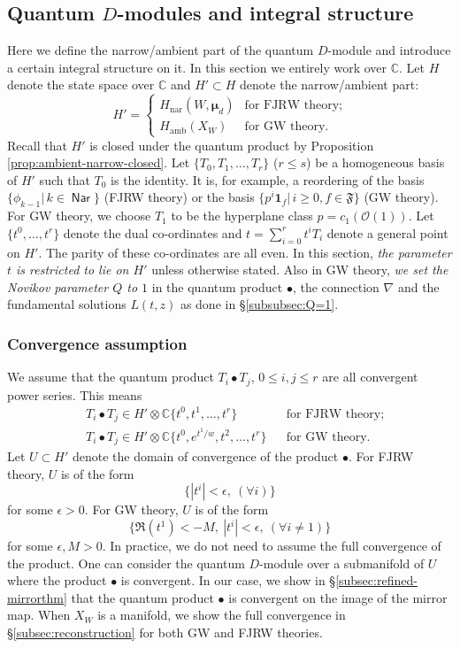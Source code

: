 \documentclass[11pt]{amsart}
\theoremstyle{definition} %
\theoremstyle{remark} %
\newcommand{\CC}{\mathbb C}
\newcommand{\nar}{\operatorname{nar}}
\newcommand{\bmu}{\boldsymbol{\mu}}
\newcommand{\cO}{\mathcal{O}}
\newcommand{\frF}{\mathfrak{F}}
\newcommand{\unit}{\boldsymbol{1}}
\newcommand{\Nar}{\operatorname{\mathsf{Nar}}}
\newcommand{\amb}{\operatorname{amb}}
\begin{document}
\subsection{Quantum $D$-modules and integral structure} 
\label{subsec:qdm_int} 
Here we define the narrow/ambient part of the 
quantum $D$-module and introduce a certain 
integral structure on it. 
In this section we entirely work over $\CC$. 
Let $H$ denote the state space over $\CC$ 
and $H'\subset H$ denote the narrow/ambient part: 
\begin{equation} 
\label{eq:narrow-ambient-part} 
H'= \begin{cases} 
H_{\nar}(W,\bmu_d) & \text{for FJRW theory;} \\
H_{\amb}(X_W) & \text{for GW theory.} 
\end{cases}  
\end{equation} 
Recall that $H'$ is closed under the quantum product 
by Proposition \ref{prop:ambient-narrow-closed}. 
Let $\{T_0,T_1,\dots,T_r\}$ ($r\le s$) be a homogeneous basis of 
$H'$ such that $T_0$ is the identity. 
It is, for example, a reordering of 
the basis $\{\phi_{k-1}|\, k\in \Nar\}$ (FJRW theory) 
or the basis $\{p^i \unit_f |\, i\ge 0, f\in \frF\}$ 
(GW theory). 
For GW theory, we choose $T_1$ 
to be the hyperplane class $p=c_1(\cO(1))$. 
Let $\{t^0,\dots,t^r\}$ denote the dual co-ordinates 
and $t = \sum_{i=0}^r t^i T_i$ denote a general point 
on $H'$.  
The parity of these co-ordinates are all even. 
In this section, \emph{the parameter $t$ is restricted 
to lie on $H'$} unless otherwise stated. 
Also in GW theory, 
\emph{we set the Novikov parameter $Q$ to $1$}   
in the quantum product $\bullet$, the 
connection $\nabla$ and the fundamental solutions 
$L(t,z)$ as done in \S \ref{subsubsec:Q=1}. 

\subsubsection{Convergence assumption} 
\label{subsubsec:convergence} 
We assume that the quantum product 
$T_i \bullet T_j$, $0\le i,j\le r$ are all 
convergent power series. This means 
\begin{align*}
& T_i \bullet T_j \in H'\otimes \CC\{t^0,t^1,\dots,t^r\} 
& & \text{for FJRW theory;} \\
& T_i \bullet T_j \in H' \otimes \CC\{t^0,e^{t^1/w},
t^2,\dots,t^r\}
& & \text{for GW theory.} 
\end{align*} 
Let $U\subset H'$ denote the domain of convergence of 
the product $\bullet$.  
For FJRW theory, $U$ is of the form 
\[
\{ |t^i| < \epsilon, \ (\forall i) \} 
\]
for some $\epsilon>0$. 
For GW theory, $U$ is of the form 
\[
\{ \Re(t^1) <-M, \ |t^i|< \epsilon,\  
(\forall i\neq 1)\} 
\]
for some $\epsilon, M>0$. 
In practice, we do not need to assume 
the full convergence of the product. 
One can consider the quantum $D$-module 
over a submanifold of $U$ where the product 
$\bullet$ is convergent. 
In our case, we show in \S \ref{subsec:refined-mirrorthm} 
that the quantum product $\bullet$ is convergent on 
the image of the mirror map. 
When $X_W$ is a manifold, we show the full convergence 
in \S \ref{subsec:reconstruction} for 
both GW and FJRW theories. 
\end{document}
